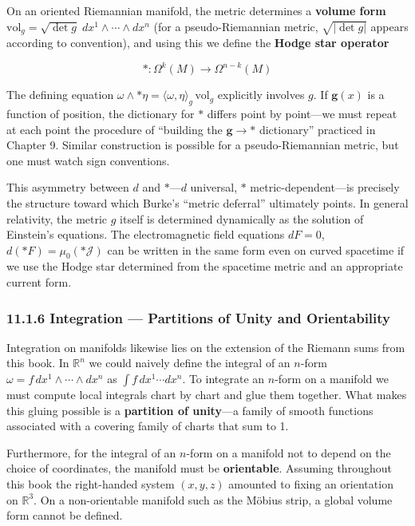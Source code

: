 On an oriented Riemannian manifold, the metric determines a
\textbf{volume form}
\(\mathrm{vol}_g = \sqrt{\det g}\;dx^1 \wedge \cdots \wedge dx^n\) (for
a pseudo-Riemannian metric, \(\sqrt{|\det g|}\) appears according to
convention), and using this we define the \textbf{Hodge star operator}

\[\ast: \Omega^k(M) \to \Omega^{n-k}(M)\]

The defining equation
\(\omega \wedge \ast\eta = \langle\omega,\eta\rangle_g\,\mathrm{vol}_g\)
explicitly involves \(g\). If \(\mathbf{g}(x)\) is a function of
position, the dictionary for \(\ast\) differs point by point---we must
repeat at each point the procedure of ``building the
\(\mathbf{g} \to \ast\) dictionary'' practiced in Chapter 9. Similar
construction is possible for a pseudo-Riemannian metric, but one must
watch sign conventions.

This asymmetry between \(d\) and \(\ast\)---\(d\) universal, \(\ast\)
metric-dependent---is precisely the structure toward which Burke's
``metric deferral'' ultimately points. In general relativity, the metric
\(g\) itself is determined dynamically as the solution of Einstein's
equations. The electromagnetic field equations \(dF = 0\),
\(d(\ast F) = \mu_0(\ast\mathcal{J})\) can be written in the same form
even on curved spacetime if we use the Hodge star determined from the
spacetime metric and an appropriate current form.

\hypertarget{integration-partitions-of-unity-and-orientability}{%
\subsubsection{11.1.6 Integration --- Partitions of Unity and
Orientability}\label{integration-partitions-of-unity-and-orientability}}

Integration on manifolds likewise lies on the extension of the Riemann
sums from this book. In \(\mathbb{R}^n\) we could naively define the
integral of an \(n\)-form \(\omega = f\,dx^1 \wedge \cdots \wedge dx^n\)
as \(\int f\,dx^1 \cdots dx^n\). To integrate an \(n\)-form on a
manifold we must compute local integrals chart by chart and glue them
together. What makes this gluing possible is a \textbf{partition of
unity}---a family of smooth functions associated with a covering family
of charts that sum to 1.

Furthermore, for the integral of an \(n\)-form on a manifold not to
depend on the choice of coordinates, the manifold must be
\textbf{orientable}. Assuming throughout this book the right-handed
system \((x,y,z)\) amounted to fixing an orientation on
\(\mathbb{R}^3\). On a non-orientable manifold such as the Möbius strip,
a global volume form cannot be defined.

